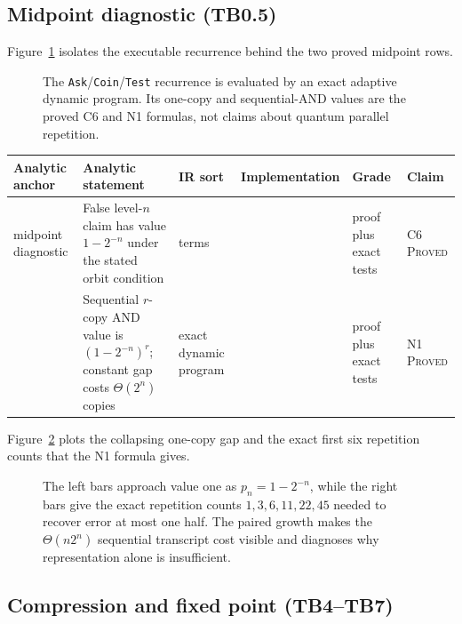 \subsection{Midpoint diagnostic (TB0.5)}

Figure~\ref{fig:D-correspondence-midpoint} isolates the executable recurrence
behind the two proved midpoint rows.
\begin{figure}[H]
\centering

\caption{The \texttt{Ask}/\texttt{Coin}/\texttt{Test} recurrence is evaluated by an exact adaptive dynamic program.  Its one-copy and sequential-AND values are the proved C6 and N1 formulas, not claims about quantum parallel repetition.}
\label{fig:D-correspondence-midpoint}
\end{figure}

\scriptsize
\begin{longtable}{P{0.21\textwidth}P{0.16\textwidth}P{0.19\textwidth}P{0.19\textwidth}P{0.12\textwidth}P{0.08\textwidth}}
\toprule
Analytic anchor & Analytic statement & IR sort & Implementation & Grade & Claim \\
\midrule
\endhead
{}\newline midpoint diagnostic
& False level-\(n\) claim has value \(1-2^{-n}\) under the stated orbit condition
&  terms & 
& proof plus exact tests & C6 \textsc{Proved} \\
& Sequential \(r\)-copy AND value is \((1-2^{-n})^r\); constant gap costs
\(\Theta(2^n)\) copies & exact dynamic program & 
& proof plus exact tests & N1 \textsc{Proved} \\
\bottomrule
\end{longtable}
\normalsize

Figure~\ref{fig:midpoint-diagnostic} plots the collapsing one-copy gap and the
exact first six repetition counts that the N1 formula gives.
\begin{figure}[t]
\centering

\caption{The left bars approach value one as \(p_n=1-2^{-n}\), while the right bars give the exact repetition counts \(1,3,6,11,22,45\) needed to recover error at most one half.  The paired growth makes the \(\Theta(n2^n)\) sequential transcript cost visible and diagnoses why representation alone is insufficient.}
\label{fig:midpoint-diagnostic}
\end{figure}

\subsection{Compression and fixed point (TB4--TB7)}
\label{sec:tables-compression}

